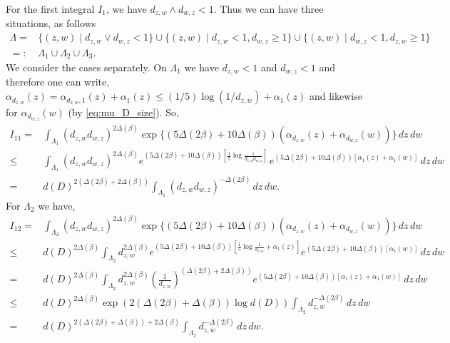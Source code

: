 \documentclass[a4paper, 11pt, reqno]{amsart}
\theoremstyle{definition} \newtheorem{defn}{Definition}[section]
\theoremstyle{remark} \newtheorem{rem}[defn]{Remark}
\theoremstyle{remark} \newtheorem*{rem*}{Remark}
\theoremstyle{plain} \newtheorem{thm}[defn]{Theorem}
\theoremstyle{plain} \newtheorem{lem}[defn]{Lemma}
\theoremstyle{plain} \newtheorem{prop}[defn]{Proposition}
\theoremstyle{plain} \newtheorem{cor}[defn]{Corollary}
\theoremstyle{remark} \newtheorem{exm}[defn]{\textbf{Example}}
\theoremstyle{remark} \newtheorem{exms}[defn]{\textbf{Examples}}
\theoremstyle{remark} \newtheorem*{bl}{}
\numberwithin{equation}{section} %
\begin{document}
		For the first integral $I_1$, we have $d_{z,w} \wedge d_{w,z} < 1$. Thus we can have three situations, as follows
		\begin{align}
			\Lambda = &  \{(z,w)  \mid d_{z,w}\vee d_{w,z} < 1 \} \cup \{(z,w) \mid d_{z,w} < 1, d_{w,z} \ge 1\} \cup  \{(z,w)  \mid d_{w,z} < 1, d_{z, w} \ge 1 \} 
			\nonumber \\
			=: & \Lambda_1 \cup \Lambda_2 \cup \Lambda_3.
		\end{align} 
		We consider the cases separately. On $\Lambda_1$ we have $d_{z,w} < 1$ and $d_{w,z}< 1$ and therefore one can write, $\alpha_{d_{z,w}}(z) = \alpha_{d_{z,w}, 1} (z) +\alpha_{1} (z) \le (1/5) \log (1/d_{z,w}) + \alpha_{1} (z)$ and likewise for $\alpha_{d_{w,z}}(w)$ (by \eqref{eq:mu_D_size}). So,
		\begin{align}\label{eq:L^1_6}
			I_{11} =& \int_{\Lambda_1}  (d_{z,w}d_{w,z})^{2 \Delta(\beta)} \exp\{(5\Delta(2\beta) + 10\Delta(\beta)) (\alpha_{d_{z,w}}(z) + \alpha_{d_{w,z}}(w))\} \, dz \, dw 
			\nonumber \\
			\le &\int_{\Lambda_1} (d_{z,w}d_{w,z})^{2 \Delta(\beta)} e^{ (5\Delta(2\beta) + 10\Delta(\beta)) \left[\frac{1}{5} \log \frac{1}{d_{z,w}d_{w,z}} \right]} \, e^{(5\Delta(2\beta) + 10\Delta(\beta))[\alpha_{1}(z) + \alpha_{1}(w)]} \, dz \, dw
			\nonumber \\
			= & 	d(D)^{2 (\Delta(2\beta) + 2\Delta(\beta))} \int_{\Lambda_1} (d_{z,w}d_{w,z})^{-\Delta(2\beta) } \, dz \, dw  .
		\end{align}
		 For $\Lambda_2$ we have,
		\begin{align}\label{eq:L^1_7}
			I_{12} = &  \int_{\Lambda_2} (d_{z,w}d_{w,z})^{2 \Delta(\beta)}  \exp\{ (5\Delta(2\beta) + 10\Delta(\beta)) (\alpha_{d_{z,w}}(z) + \alpha_{d_{w,z}}(w))\} \, dz \, dw 
			\nonumber \\
			\le & d(D)^{2\Delta(\beta)}\int_{\Lambda_2} d_{z,w}^{2 \Delta(\beta)}  e^{(5\Delta(2\beta) + 10\Delta(\beta)) \left[ \frac{1}{5}\log \frac{1}{d_{z,w}} +\alpha_{1}(z)\right]} e^{(5\Delta(2\beta) + 10\Delta(\beta)) [ \alpha_{1}(w)]} \, dz \,  dw
			\nonumber \\
			= & d(D)^{2\Delta(\beta)}\int_{\Lambda_2} d_{z,w}^{2 \Delta(\beta)} \left( \frac{1}{d_{z,w}}\right)^{(\Delta(2\beta) + 2\Delta(\beta))} e^{(5\Delta(2\beta) + 10\Delta(\beta)) [ \alpha_{1}(z)+ \alpha_{1}(w)]}\, dz \,  dw
			\nonumber \\
			\le & d(D)^{2\Delta(\beta)}\exp\left(2(\Delta(2\beta) + \Delta(\beta)) \log d(D) \right)  \int_{\Lambda_2} d_{z,w}^{-\Delta(2\beta) } \, dz  \, dw
			\nonumber \\
			= & d(D)^{2(\Delta(2\beta) + \Delta(\beta)) + 2\Delta(\beta)}  \int_{\Lambda_2} d_{z,w}^{-\Delta(2\beta)} \, dz \,  dw.
		\end{align}
\end{document}
